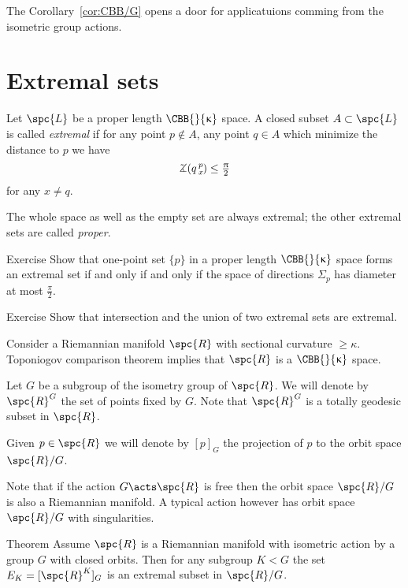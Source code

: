 
The Corollary~\ref{cor:CBB/G} opens a door for applicatuions comming from the isometric group actions.


\section{Extremal sets}

Let $\spc{L}$ be a proper length $\CBB{}{\kappa}$ space.
A closed subset $A\subset\spc{L}$ is called \emph{extremal} if for any point $p\notin A$, 
any point $q\in A$ which minimize the distance to $p$ we have
\[\angk qpx\le \tfrac\pi2\]
for any $x\ne q$.

The whole space as well as the empty set are always extremal;
the other extremal sets are called \emph{proper}.

\begin{thm}{Exercise}
Show that one-point set $\{p\}$ in a proper length $\CBB{}{\kappa}$ space forms an extremal set if and only if and only if the space of directions $\Sigma_p$ has diameter at most $\tfrac\pi2$.
\end{thm}

\begin{thm}{Exercise}
Show that intersection and the union of two extremal sets are extremal. 
\end{thm}

Consider a Riemannian manifold $\spc{R}$ with sectional curvature $\ge \kappa$.
Toponiogov comparison theorem implies that $\spc{R}$ is a $\CBB{}{\kappa}$ space.

Let $G$ be a subgroup of the isometry group of $\spc{R}$.
We will denote by $\spc{R}^G$ the set of points fixed by $G$.
Note that $\spc{R}^G$ is a totally geodesic subset in $\spc{R}$.

Given $p\in \spc{R}$ we will denote by $[p]_G$ the projection of $p$ to the orbit space $\spc{R}/G$.

Note that if the action $G\acts \spc{R}$ is free then the orbit space 
$\spc{R}/G$ is also a Riemannian manifold.
A typical action however has orbit space 
$\spc{R}/G$ with singularities.

\begin{thm}{Theorem}
Assume $\spc{R}$ is a Riemannian manifold with isometric action by a group $G$ with closed orbits.
Then for any subgroup $K<G$ the set $E_K=[\spc{R}^K]_G$ is an extremal subset in $\spc{R}/G$.
\end{thm}

